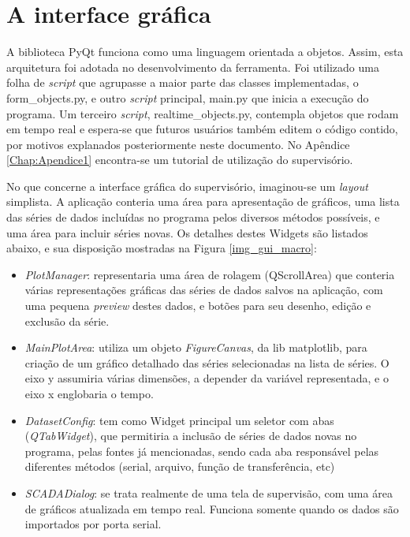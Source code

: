 \section{A interface gráfica}

A biblioteca PyQt funciona como uma linguagem orientada a objetos. Assim, esta arquitetura foi adotada no desenvolvimento da ferramenta. Foi utilizado uma folha de \emph{script} que agrupasse a maior parte das classes implementadas, o form\_objects.py, e outro \emph{script} principal, main.py que inicia a execução do programa. Um terceiro \emph{script}, realtime\_objects.py, contempla objetos que rodam em tempo real e espera-se que futuros usuários também editem o código contido, por motivos explanados posteriormente neste documento. No Apêndice \ref{Chap:Apendice1} encontra-se um tutorial de utilização do supervisório.

No que concerne a interface gráfica do supervisório, imaginou-se um \emph{layout} simplista. A aplicação conteria uma área para apresentação de gráficos, uma lista das séries de dados incluídas no programa pelos diversos métodos possíveis, e uma área para incluir séries novas. Os detalhes destes Widgets são listados abaixo, e sua disposição mostradas na Figura \ref{img_gui_macro}:

\begin{itemize}
	\item \emph{PlotManager}: representaria uma área de rolagem (QScrollArea) que conteria várias representações gráficas das séries de dados salvos na aplicação, com uma pequena \emph{preview} destes dados, e botões para seu desenho, edição e exclusão da série.
	\item \emph{MainPlotArea}: utiliza um objeto \emph{FigureCanvas}, da lib matplotlib, para criação de um gráfico detalhado das séries selecionadas na lista de séries. O eixo y assumiria várias dimensões, a depender da variável representada, e o eixo x englobaria o tempo.
	\item \emph{DatasetConfig}: tem como Widget principal um seletor com abas (\emph{QTabWidget}), que permitiria a inclusão de séries de dados novas no programa, pelas fontes já mencionadas, sendo cada aba responsável pelas diferentes métodos (serial, arquivo, função de transferência, etc)
	\item \emph{SCADADialog}: se trata realmente de uma tela de supervisão, com uma área de gráficos atualizada em tempo real. Funciona somente quando os dados são importados por porta serial.
\end{itemize}

